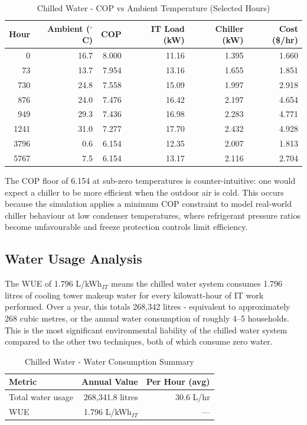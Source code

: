 ﻿\documentclass[12pt,a4paper]{report}
\newcommand{\degC}{$^{\circ}$C}
\begin{document}
\begin{table}[H]
\centering
\caption{Chilled Water - COP vs Ambient Temperature (Selected Hours)}
\label{tab:chw_cop}
\renewcommand{\arraystretch}{1.3}
\begin{tabular}{rrrrrr}
\toprule
\textbf{Hour} & \textbf{Ambient (\degC)} & \textbf{COP} & \textbf{IT Load (kW)} & \textbf{Chiller (kW)} & \textbf{Cost (\$/hr)} \\
\midrule
0    & 16.7 & 8.000 & 11.16 & 1.395 & 1.660 \\
73   & 13.7 & 7.954 & 13.16 & 1.655 & 1.851 \\
730  & 24.8 & 7.558 & 15.09 & 1.997 & 2.918 \\
876  & 24.0 & 7.476 & 16.42 & 2.197 & 4.654 \\
949  & 29.3 & 7.436 & 16.98 & 2.283 & 4.771 \\
1241 & 31.0 & 7.277 & 17.70 & 2.432 & 4.928 \\
3796 & 0.6  & 6.154 & 12.35 & 2.007 & 1.813 \\
5767 & 7.5  & 6.154 & 13.17 & 2.116 & 2.704 \\
\bottomrule
\end{tabular}
\end{table}

\noindent The COP floor of 6.154 at sub-zero temperatures is counter-intuitive: one would expect
a chiller to be more efficient when the outdoor air is cold. This occurs because the
simulation applies a minimum COP constraint to model real-world chiller behaviour at
low condenser temperatures, where refrigerant pressure ratios become unfavourable and
freeze protection controls limit efficiency.

\subsection{Water Usage Analysis}

The WUE of 1.796 L/kWh$_{IT}$ means the chilled water system consumes 1.796 litres of
cooling tower makeup water for every kilowatt-hour of IT work performed. Over a year,
this totals 268{,}342 litres - equivalent to approximately 268 cubic metres, or the
annual water consumption of roughly 4--5 households. This is the most significant
environmental liability of the chilled water system compared to the other two techniques,
both of which consume zero water.

\begin{table}[H]
\centering
\caption{Chilled Water - Water Consumption Summary}
\label{tab:chw_water}
\renewcommand{\arraystretch}{1.35}
\begin{tabular}{lrr}
\toprule
\textbf{Metric} & \textbf{Annual Value} & \textbf{Per Hour (avg)} \\
\midrule
Total water usage & 268{,}341.8 litres & 30.6 L/hr \\
WUE & 1.796 L/kWh$_{IT}$ & --- \\
\bottomrule
\end{tabular}
\end{table}
\end{document}
